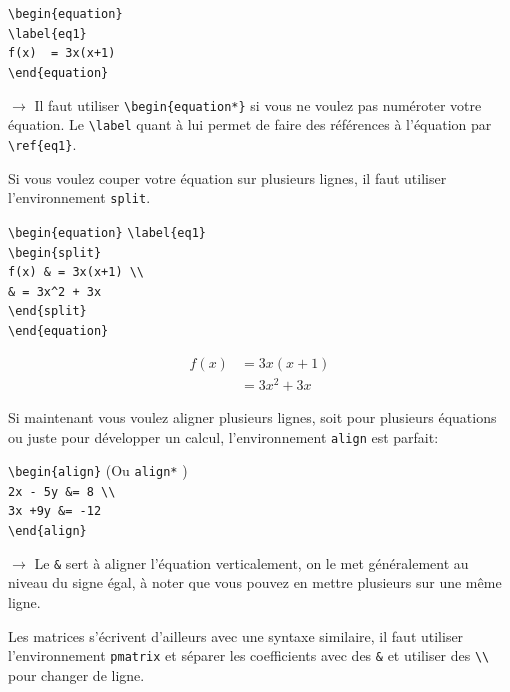 \documentclass[11pt]{article}				%
\newcommand{\cmd}[2]{\texttt{\textbackslash #1}\texttt{\{#2\}}}
\begin{document}
\begin{multicols}{2}

\cmd{begin}{equation} \\
\cmd{label}{eq1} \\
\verb|f(x)  = 3x(x+1) | \\
\cmd{end}{equation} 

\columnbreak

$\rightarrow$ Il faut utiliser \cmd{begin}{equation*} si vous ne voulez pas numéroter votre équation. Le \verb|\label| quant à lui permet de faire des références à l'équation par \verb|\ref{eq1}|.

\end{multicols}
Si vous voulez couper votre équation sur plusieurs lignes, il faut utiliser l'environnement \verb|split|.
\begin{multicols}{2}
\cmd{begin}{equation} \cmd{label}{eq1} \\
\cmd{begin}{split} \\
\verb|f(x) & = 3x(x+1) \\ | \\
\verb|& = 3x^2 + 3x | \\
\cmd{end}{split} \\
\cmd{end}{equation} 

\columnbreak

\begin{equation} \label{eq1}
\begin{split}
f(x) & = 3x(x+1) \\
& = 3x^2 +3x
\end{split}
\end{equation}
	
\end{multicols}

Si maintenant vous voulez aligner plusieurs lignes, soit pour plusieurs équations ou juste pour développer un calcul, l'environnement \verb|align| est parfait:

\begin{multicols}{2}

\cmd{begin}{align} \quad (Ou \verb|align*| )\\
\verb|2x - 5y &= 8 \\| \\
\verb|3x +9y &= -12| \\
\cmd{end}{align} \\

\columnbreak

$\rightarrow$ Le \verb|&| sert à aligner l'équation verticalement, on le met généralement au niveau du signe égal, à noter que vous pouvez en mettre plusieurs sur une même ligne.

\end{multicols} 
Les matrices s'écrivent d'ailleurs avec une syntaxe similaire, il faut utiliser l'environnement \texttt{pmatrix} et séparer les coefficients avec des \verb|&| et utiliser des \verb|\\| pour changer de ligne.\\  
\end{document}

